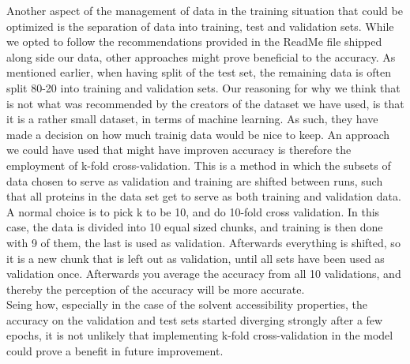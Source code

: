 Another aspect of the management of data in the training situation that could be optimized is the separation of data into training, test and validation sets. While we opted to follow the recommendations provided in the ReadMe file shipped along side our data, other approaches might prove beneficial to the accuracy. As mentioned earlier, when having split of the test set, the remaining data is often split 80-20 into training and validation sets. Our reasoning for why we think that is not what was recommended by the creators of the dataset we have used, is that it is a rather small dataset, in terms of machine learning. As such, they have made a decision on how much trainig data would be nice to keep. An approach we could have used that might have improven accuracy is therefore the employment of k-fold cross-validation. This is a method in which the subsets of data chosen to serve as validation and training are shifted between runs, such that all proteins in the data set get to serve as both training and validation data. A normal choice is to pick k to be 10, and do 10-fold cross validation. In this case, the data is divided into 10 equal sized chunks, and training is then done with 9 of them, the last is used as validation. Afterwards everything is shifted, so it is a new chunk that is left out as validation, until all sets have been used as validation once. Afterwards you average the accuracy from all 10 validations, and thereby the perception of the accuracy will be more accurate.\\ Seing how, especially in the case of the solvent accessibility properties, the accuracy on the validation and test sets started diverging strongly after a few epochs, it is not unlikely that implementing k-fold cross-validation in the model could prove a benefit in future improvement.


